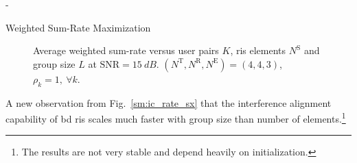 \documentclass[journal]{IEEEtran}
\begin{document}
\begin{section}{-}
\begin{subsection}{Weighted Sum-Rate Maximization}
		\begin{figure}[!t]
			\centering
			\resizebox{0.65\columnwidth}{!}{
				
			}
			\caption{Average weighted sum-rate versus user pairs $K$, \gls{ris} elements $N^\mathrm{S}$ and group size $L$ at $\mathrm{SNR} = \qty{15}{dB}$. $(N^\mathrm{T}, N^\mathrm{R}, N^\mathrm{E}) = (4, 4, 3)$, $\rho_k = 1, \ \forall k$.}
			\label{sm:ic_rate_user}
		\end{figure}

		A new observation from Fig.~\ref{sm:ic_rate_sx} that the interference alignment capability of \gls{bd} \gls{ris} scales much faster with group size than number of elements.\footnote{The results are not very stable and depend heavily on initialization.}
	\end{subsection}
\end{section}




\end{document}
